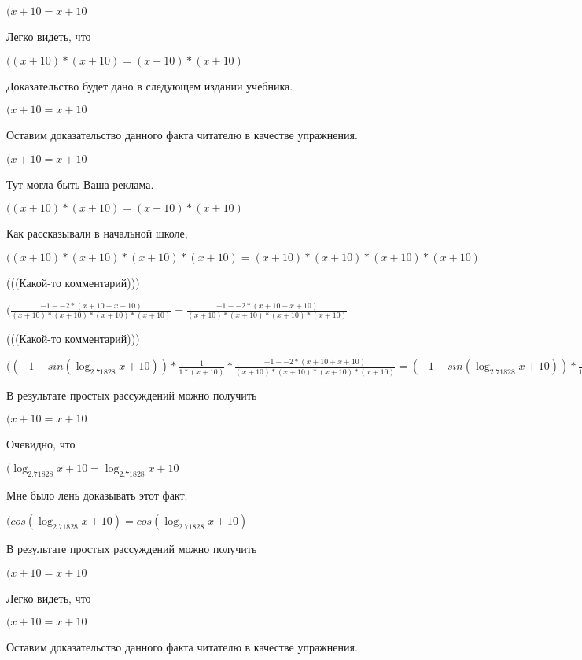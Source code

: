 \documentclass[12pt,a4paper,fleqn]{article}
\theoremstyle{definition}
\begin{document}
$( x  +  10  =  x  +  10 $

Легко видеть, что

$(( x  +  10 ) * ( x  +  10 ) = ( x  +  10 ) * ( x  +  10 )$

Доказательство будет дано в следующем издании учебника.

$( x  +  10  =  x  +  10 $

Оставим доказательство данного факта читателю в качестве упражнения.

$( x  +  10  =  x  +  10 $

Тут могла быть Ваша реклама.

$(( x  +  10 ) * ( x  +  10 ) = ( x  +  10 ) * ( x  +  10 )$

Как рассказывали в начальной школе,

$(( x  +  10 ) * ( x  +  10 ) * ( x  +  10 ) * ( x  +  10 ) = ( x  +  10 ) * ( x  +  10 ) * ( x  +  10 ) * ( x  +  10 )$

(((Какой-то комментарий)))

$(\frac{ -1  -  -2  * ( x  +  10  +  x  +  10 )}{( x  +  10 ) * ( x  +  10 ) * ( x  +  10 ) * ( x  +  10 )}
 = \frac{ -1  -  -2  * ( x  +  10  +  x  +  10 )}{( x  +  10 ) * ( x  +  10 ) * ( x  +  10 ) * ( x  +  10 )}
$

(((Какой-то комментарий)))

$(( -1  - sin(\log_{ 2.71828 }{ x  +  10 })) * \frac{ 1 }{ 1  * ( x  +  10 )}
 * \frac{ -1  -  -2  * ( x  +  10  +  x  +  10 )}{( x  +  10 ) * ( x  +  10 ) * ( x  +  10 ) * ( x  +  10 )}
 = ( -1  - sin(\log_{ 2.71828 }{ x  +  10 })) * \frac{ 1 }{ 1  * ( x  +  10 )}
 * \frac{ -1  -  -2  * ( x  +  10  +  x  +  10 )}{( x  +  10 ) * ( x  +  10 ) * ( x  +  10 ) * ( x  +  10 )}
$

В результате простых рассуждений можно получить

$( x  +  10  =  x  +  10 $

Очевидно, что

$(\log_{ 2.71828 }{ x  +  10 } = \log_{ 2.71828 }{ x  +  10 }$

Мне было лень доказывать этот факт.

$(cos(\log_{ 2.71828 }{ x  +  10 }) = cos(\log_{ 2.71828 }{ x  +  10 })$

В результате простых рассуждений можно получить

$( x  +  10  =  x  +  10 $

Легко видеть, что

$( x  +  10  =  x  +  10 $

Оставим доказательство данного факта читателю в качестве упражнения.
\end{document}
